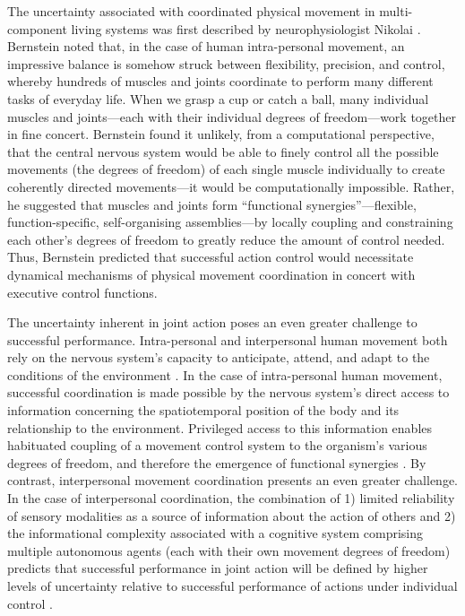 \begin{CJK}{UTF8}{gbsn}
The uncertainty associated with coordinated physical movement in multi-component living systems was first described by neurophysiologist Nikolai \textcite{Bernstein1967}.  Bernstein noted that, in the case of human intra-personal movement, an impressive balance is somehow struck between flexibility, precision, and control, whereby hundreds of muscles and joints coordinate to perform many different tasks of everyday life.  When we grasp a cup or catch a ball, many individual muscles and joints---each with their individual degrees of freedom---work together in fine concert.  Bernstein found it unlikely, from a computational perspective, that the central nervous system would be able to finely control all the possible movements (the degrees of freedom) of each single muscle individually to create coherently directed movements---it would be computationally impossible.  Rather, he suggested that muscles and joints form  ``functional synergies''---flexible, function-specific, self-organising assemblies---by locally coupling and constraining each other's degrees of freedom to greatly reduce the amount of control needed.  Thus, Bernstein predicted that successful action control would necessitate dynamical mechanisms of physical movement coordination in concert with executive control functions.

The uncertainty inherent in joint action poses an even greater challenge to successful performance.  Intra-personal and interpersonal human movement both rely on the nervous system's capacity to anticipate, attend, and adapt to the conditions of the environment \citep{Keller2014}.  In the case of intra-personal human movement, successful coordination is made possible by the nervous system's direct access to information concerning the spatiotemporal position of the body and its relationship to the environment.  Privileged access to this information enables habituated coupling of a movement control system to the organism's various degrees of freedom, and therefore the emergence of functional synergies \citep{Riley2011}.  By contrast, interpersonal movement coordination presents an even greater challenge.  In the case of interpersonal coordination, the combination of 1) limited reliability of sensory modalities as a source of information about the action of others \citep{Wilson2005,Wolpert2003,Frith2007} and 2) the informational complexity associated with a cognitive system comprising multiple autonomous agents (each with their own movement degrees of freedom) predicts that successful performance in joint action will be defined by higher levels of uncertainty relative to successful performance of actions under individual control \citep{Turvey1978}.


\end{CJK}
